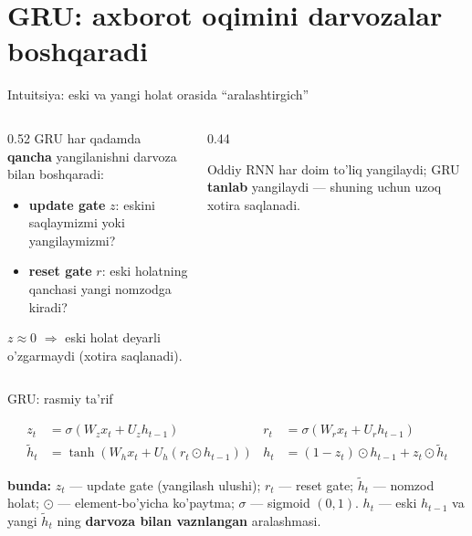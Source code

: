 \documentclass[aspectratio=169,11pt]{beamer}
\newcommand{\bunda}[1]{{\small\textbf{bunda:}\; #1}}
\begin{document}
\section[GRU]{GRU: axborot oqimini darvozalar boshqaradi}

\begin{frame}{Intuitsiya: eski va yangi holat orasida ``aralashtirgich''}
  \begin{columns}[T]
    \begin{column}{0.52\textwidth}
      \small
      GRU har qadamda \textbf{qancha} yangilanishni darvoza bilan boshqaradi:
      \begin{itemize}\setlength\itemsep{1pt}
        \item \textbf{update gate} $z$: eskini saqlaymizmi yoki yangilaymizmi?
        \item \textbf{reset gate} $r$: eski holatning qanchasi yangi nomzodga kiradi?
      \end{itemize}
      \vspace{4pt}
      $z\approx 0$ $\Rightarrow$ eski holat deyarli o'zgarmaydi (xotira saqlanadi).
    \end{column}
    \begin{column}{0.44\textwidth}
      \begin{tcolorbox}[okbox,top=2pt,bottom=2pt]
        \footnotesize
        Oddiy RNN har doim to'liq yangilaydi; GRU \textbf{tanlab} yangilaydi ---
        shuning uchun uzoq xotira saqlanadi.
      \end{tcolorbox}
    \end{column}
  \end{columns}
\end{frame}

\begin{frame}{GRU: rasmiy ta'rif}
  \begin{tcolorbox}[defbox,title=Ta'rif: GRU katagi]
    \vspace{-0.5em}
    \begin{align*}
      z_t &= \sigma(W_z x_t + U_z h_{t-1}) &
      r_t &= \sigma(W_r x_t + U_r h_{t-1})\\
      \tilde{h}_t &= \tanh(W_h x_t + U_h(r_t \odot h_{t-1})) &
      h_t &= (1-z_t)\odot h_{t-1} + z_t \odot \tilde{h}_t
    \end{align*}
  \end{tcolorbox}
  \vspace{2pt}
  \bunda{$z_t$ --- update gate (yangilash ulushi); $r_t$ --- reset gate;
  $\tilde{h}_t$ --- nomzod holat; $\odot$ --- element-bo'yicha ko'paytma;
  $\sigma$ --- sigmoid $(0,1)$.}
  \vspace{4pt}
  \footnotesize $h_t$ --- eski $h_{t-1}$ va yangi $\tilde{h}_t$ ning
  \textbf{darvoza bilan vaznlangan} aralashmasi.
\end{frame}
\end{document}
